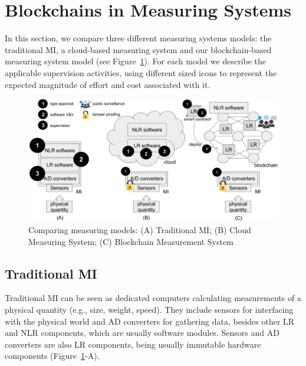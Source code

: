 \documentclass[journal]{IEEEtran} %
\begin{document}
\section{Blockchains in Measuring Systems}
In this section, we compare three different measuring systems models: the traditional MI, a cloud-based measuring system and our blockchain-based measuring system model (see Figure~\ref{f:compare}). For each model we describe the applicable supervision activities, using different sized icons to represent the expected magnitude of effort and cost associated with it.

\begin{figure}[!t]
\centering
\includegraphics[width=.69\textwidth]{measuring} %
\caption{Comparing measuring models: (A) Traditional MI; (B) Cloud Measuring System; (C) Blockchain Measurement System}
\label{f:compare}
\end{figure}

\subsection{Traditional MI}
\label{s:mi_traditional}
Traditional MI can be seen as dedicated computers calculating measurements of a physical quantity (e.g., size, weight, speed). They include sensors for interfacing with the physical world and AD converters for gathering data, besides other LR and NLR components, which are usually software modules. Sensors and AD converters are also LR components, being usually immutable hardware components (Figure~\ref{f:compare}-A).
\end{document}
